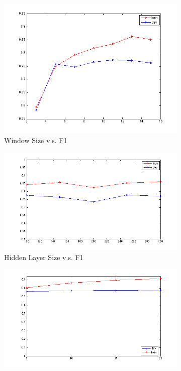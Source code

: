 \documentclass[letterpaper]{article}
\begin{document}
\begin{figure}[ht]
\centering
\begin{subfigure}{.5\textwidth}
  \includegraphics[scale=0.5, width=1.0\linewidth]{window.png}
  \caption{Window Size v.s. F1}
  \label{fig:window}
\end{subfigure}%
\begin{subfigure}{.5\textwidth}
  \includegraphics[scale=0.5, width=1.0\linewidth]{hidden.png}
  \caption{Hidden Layer Size v.s. F1}
  \label{fig:hidden}
\end{subfigure}
\begin{subfigure}{.5\textwidth}
  \includegraphics[scale=0.5, width=1.0\linewidth]{epoch.png}

\end{subfigure}
\end{figure}
\end{document}
